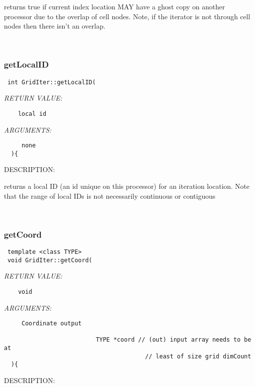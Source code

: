       returns true if current index location MAY  have a ghost copy on another processor 
   due to the overlap of cell nodes. Note, if the iterator is not through cell nodes then
   there isn't an overlap.
   
 
\mbox{}\hrulefill\
 
\subsubsection [getLocalID] {getLocalID}


  
\begin{verbatim} int GridIter::getLocalID(\end{verbatim}{\em RETURN VALUE:}
\begin{verbatim}    local id\end{verbatim}{\em ARGUMENTS:}
\begin{verbatim}     none  
  ){\end{verbatim}
{\sf DESCRIPTION:\\ }


     returns a local ID (an id unique on this processor) for an iteration location. 
     Note that the range of local IDs is not necessarily continuous or contiguous
   
 
\mbox{}\hrulefill\
 
\subsubsection [getCoord] {getCoord}


  
\begin{verbatim} template <class TYPE>
 void GridIter::getCoord(\end{verbatim}{\em RETURN VALUE:}
\begin{verbatim}    void\end{verbatim}{\em ARGUMENTS:}
\begin{verbatim}     Coordinate output 
   
                          TYPE *coord // (out) input array needs to be at
                                        // least of size grid dimCount    
  ){\end{verbatim}
{\sf DESCRIPTION:\\ }


